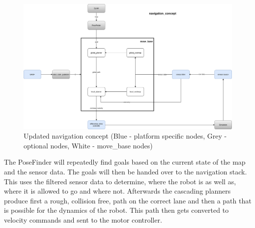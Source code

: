 \begin{figure}[H]
	\begin{center}
		\includegraphics[width=140mm]{Pictures/Updated navigation concept}
		\caption[updated navigation concept]{Updated navigation concept (Blue - platform specific nodes, Grey - optional nodes, White - move\_base nodes)}
		\label{navconcept}
	\end{center}
\end{figure}



The PoseFinder will repeatedly find goals based on the current state of the map and the sensor data. The goals will then be handed over to the navigation stack. This uses the filtered sensor data to determine, where the robot is as well as, where it is allowed to go and where not. Afterwards the cascading planners produce first a rough, collision free, path on the correct lane and then a path that is possible for the dynamics of the robot. This path then gets converted to velocity commands and sent to the motor controller.\\




